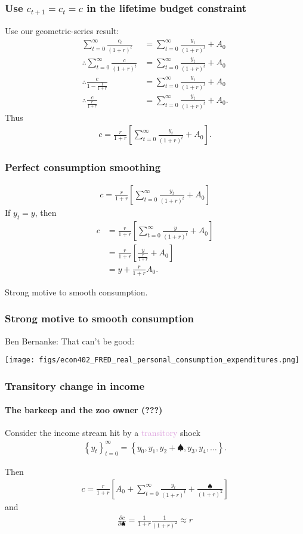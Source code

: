 \documentclass[presentation,dvipsnames]{beamer}
\begin{document}
\begin{frame}
\frametitle{Use $c_{t+1} = c_{t} = c$ in the lifetime budget constraint}
Use our geometric-series result:
\begin{align*}
\sum\limits_{t=0}^{\infty} \frac{c_{t}}{(1+r)^{t}} &=
\sum\limits_{t=0}^{\infty} \frac{y_{t}}{(1+r)^{t}} + A_{0} \\
\therefore \sum\limits_{t=0}^{\infty} \frac{c}{(1+r)^{t}} &=
\sum\limits_{t=0}^{\infty} \frac{y_{t}}{(1+r)^{t}} + A_{0} \\
\therefore \frac{c}{1- \frac{1}{1+r}} &=
\sum\limits_{t=0}^{\infty} \frac{y_{t}}{(1+r)^{t}} + A_{0} \\
\therefore \frac{c}{\frac{r}{1+r}} &=
\sum\limits_{t=0}^{\infty} \frac{y_{t}}{(1+r)^{t}} + A_{0}.
\end{align*}
Thus
\begin{align*}
c = \frac{r}{1+r} \left[ \sum\limits_{t=0}^{\infty} \frac{y_{t}}{(1+r)^{t}} + A_{0} \right].
\end{align*}
\end{frame}

\begin{frame}
\frametitle{Perfect consumption smoothing}
\begin{align*}
c = \frac{r}{1+r} \left[ \sum\limits_{t=0}^{\infty} \frac{y_{t}}{(1+r)^{t}} + A_{0} \right]
\end{align*}
If $y_{t} = y$, then
\begin{align*}
c &= \frac{r}{1+r} \left[ \sum\limits_{t=0}^{\infty} \frac{y}{(1+r)^{t}} + A_{0} \right] \\
&= \frac{r}{1+r} \left[ \frac{y}{\frac{r}{1+r}} + A_{0} \right] \\
&= y + \frac{r}{1+r} A_{0}.
\end{align*}

Strong motive to smooth consumption.
\end{frame}

\begin{frame}
\frametitle{Strong motive to smooth consumption}
Ben Bernanke: That can't be good:
\centerline{\texttt{[image: figs/econ402\_FRED\_real\_personal\_consumption\_expenditures.png]}}
\end{frame}

\begin{frame}
\frametitle{Transitory change in income}
\framesubtitle{The barkeep and the zoo owner (???)}
Consider the income stream hit by a \textcolor{Plum}{transitory} shock
\begin{align*}
\left\{ y_{t} \right\}_{t=0}^{\infty} = \left\{ y_{0},y_{1},y_{2}+\spadesuit,y_{3},y_{4},\dots \right\}.
\end{align*}

Then
\begin{align*}
c = \frac{r}{1+r} \left[ A_{0} + \sum\limits_{t=0}^{\infty} \frac{y_{t}}{(1+r)^{t}} + \frac{\spadesuit}{(1+r)^{2}} \right]
\end{align*}
and
\begin{align*}
\frac{\partial c}{\partial \spadesuit} = \frac{1}{1+r} \frac{1}{(1+r)^{2}} \approx r
\end{align*}
\end{frame}
\end{document}

